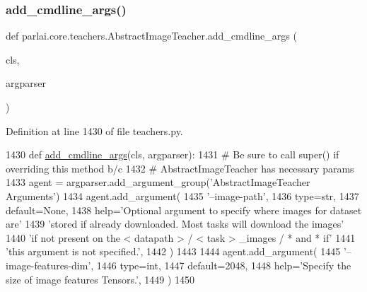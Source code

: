 \subsubsection{\texorpdfstring{add\+\_\+cmdline\+\_\+args()}{add\_cmdline\_args()}}
{\footnotesize\ttfamily def parlai.\+core.\+teachers.\+Abstract\+Image\+Teacher.\+add\+\_\+cmdline\+\_\+args (\begin{DoxyParamCaption}\item[{}]{cls,  }\item[{}]{argparser }\end{DoxyParamCaption})}



Definition at line 1430 of file teachers.\+py.


\begin{DoxyCode}
1430     \textcolor{keyword}{def }\hyperlink{namespaceparlai_1_1agents_1_1drqa_1_1config_a62fdd5554f1da6be0cba185271058320}{add\_cmdline\_args}(cls, argparser):
1431         \textcolor{comment}{# Be sure to call super() if overriding this method b/c}
1432         \textcolor{comment}{# AbstractImageTeacher has necessary params}
1433         agent = argparser.add\_argument\_group(\textcolor{stringliteral}{'AbstractImageTeacher Arguments'})
1434         agent.add\_argument(
1435             \textcolor{stringliteral}{'--image-path'},
1436             type=str,
1437             default=\textcolor{keywordtype}{None},
1438             help=\textcolor{stringliteral}{'Optional argument to specify where images for dataset are'}
1439             \textcolor{stringliteral}{'stored if already downloaded. Most tasks will download the images'}
1440             \textcolor{stringliteral}{'if not present on the < datapath > / < task > \_images / * and * if'}
1441             \textcolor{stringliteral}{'this argument is not specified.'},
1442         )
1443 
1444         agent.add\_argument(
1445             \textcolor{stringliteral}{'--image-features-dim'},
1446             type=int,
1447             default=2048,
1448             help=\textcolor{stringliteral}{'Specify the size of image features Tensors.'},
1449         )
1450 
\end{DoxyCode}
\mbox{\label{classparlai_1_1core_1_1teachers_1_1AbstractImageTeacher_ae2f395708462355b28888be7a434ebf4}} 
